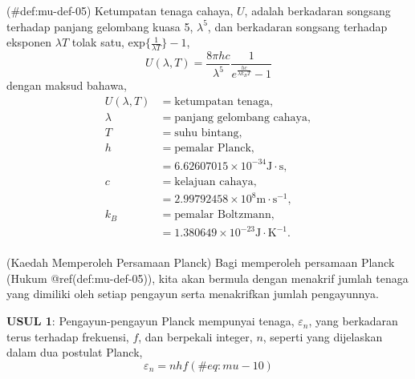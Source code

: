\documentclass[
]{book}
\begin{document}
\BeginKnitrBlock{definition}{}

\protect\hypertarget{def:mu-def-05}{}{(\#def:mu-def-05) {} }Ketumpatan tenaga cahaya, \(U\), adalah berkadaran
songsang terhadap panjang gelombang kuasa 5, \(\lambda^5\), dan
berkadaran songsang terhadap eksponen \(\lambda T\) tolak satu,
\(\text{exp}\Big\{\frac{1}{\lambda T}\Big\} - 1\), \begin{equation}
U(\lambda, T)=\frac{8\pi hc}{\lambda^5}\frac{1}{e^{\frac{hc}{\lambda k_BT}}-1}
\end{equation} dengan maksud bahawa, \begin{equation*}
\begin{split}
U(\lambda, T) & = \text{ketumpatan tenaga},\\
\lambda & = \text{panjang gelombang cahaya},\\
T & = \text{suhu bintang},\\
h & = \text{pemalar Planck},\\
& = 6.62607015\times 10^{-34}\text{J}\cdot\text{s},\\
c & = \text{kelajuan cahaya},\\
& = 2.99792458\times 10^8 \text{m}\cdot\text{s}^{-1},\\
k_B & = \text{pemalar Boltzmann},\\
& = 1.380649\times 10^{-23} \text{J}\cdot\text{K}^{-1}.\\
\end{split}
\end{equation*} 

(Kaedah Memperoleh Persamaan Planck) Bagi memperoleh persamaan Planck
(Hukum @ref(def:mu-def-05)), kita akan bermula dengan menakrif jumlah
tenaga yang dimiliki oleh setiap pengayun serta menakrifkan jumlah
pengayunnya.

\textbf{USUL 1}: Pengayun-pengayun Planck mempunyai tenaga,
\(\varepsilon_n\), yang berkadaran terus terhadap frekuensi, \(f\), dan
berpekali integer, \(n\), seperti yang dijelaskan dalam dua postulat
Planck, \begin{equation}
\varepsilon_n = nhf
(\#eq:mu-10)
\end{equation}
\end{document}
